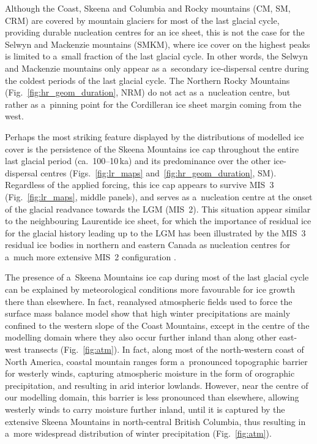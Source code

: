 \documentclass[tc, manuscript]{copernicus}
\begin{document}
      Although the Coast,
      Skeena and Columbia and Rocky mountains (CM, SM, CRM) are covered by
      mountain glaciers for most of the last glacial cycle, providing
      durable nucleation centres for an ice sheet, this is not the case for
      the Selwyn and Mackenzie mountains (SMKM), where ice cover on the
      highest peaks is limited to a~small fraction of the last glacial
      cycle. In other words, the Selwyn and Mackenzie mountains only appear
      as a~secondary ice-dispersal centre during the coldest periods of the
      last glacial cycle. The Northern Rocky Mountains
      (Fig.~\ref{fig:hr_geom_duration}, NRM) do not act as a~nucleation
      centre, but rather as a~pinning point for the Cordilleran ice sheet
      margin coming from the west.

      Perhaps the most striking feature displayed by the distributions of
      modelled ice cover is the persistence of the Skeena Mountains ice cap
      throughout the entire last glacial period (ca.~100--10\,\unit{ka}) and
      its predominance over the other ice-dispersal centres
      (Figs.~\ref{fig:lr_maps} and~\ref{fig:hr_geom_duration}, SM).
      Regardless of the applied forcing, this ice cap appears to survive
      MIS~3 (Fig.~\ref{fig:lr_maps}, middle panels), and serves as
      a~nucleation centre at the onset of the glacial readvance towards the
      LGM (MIS~2). This situation appear similar to the neighbouring
      Laurentide ice sheet, for which the importance of residual ice for the
      glacial history leading up to the LGM has been illustrated by the
      MIS~3 residual ice bodies in northern and eastern Canada as nucleation
      centres for a~much more extensive MIS~2 configuration
      \citep{Kleman.etal.2010}.

      The presence of a~Skeena Mountains ice cap during most of the last
      glacial cycle can be explained by meteorological conditions more
      favourable for ice growth there than elsewhere. In fact, reanalysed
      atmospheric fields used to force the surface mass balance model show
      that high winter precipitations are mainly confined to the western
      slope of the Coast Mountains, except in the centre of the modelling
      domain where they also occur further inland than along other east-west
      transects (Fig.~\ref{fig:atm}). In fact, along most of the
      north-western coast of North America, coastal mountain ranges form
      a~pronounced topographic barrier for westerly winds, capturing
      atmospheric moisture in the form of orographic precipitation, and
      resulting in arid interior lowlands. However, near the centre of our
      modelling domain, this barrier is less pronounced than elsewhere,
      allowing westerly winds to carry moisture further inland, until it is
      captured by the extensive Skeena Mountains in north-central British
      Columbia, thus resulting in a~more widespread distribution of winter
      precipitation (Fig.~\ref{fig:atm}).
\end{document}
